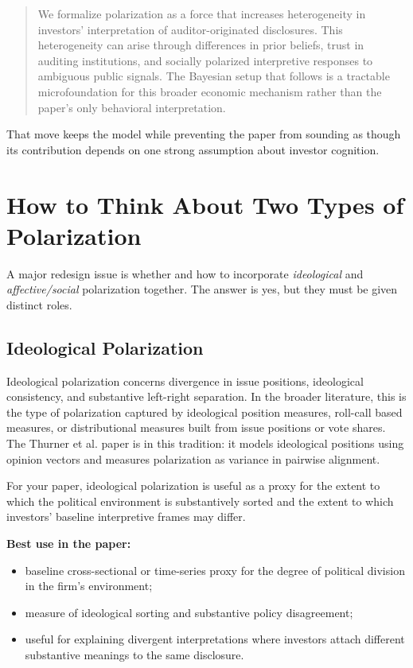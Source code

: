\documentclass[12pt]{article}
\begin{document}
\begin{quote}
We formalize polarization as a force that increases heterogeneity in investors' interpretation of auditor-originated disclosures. This heterogeneity can arise through differences in prior beliefs, trust in auditing institutions, and socially polarized interpretive responses to ambiguous public signals. The Bayesian setup that follows is a tractable microfoundation for this broader economic mechanism rather than the paper's only behavioral interpretation.
\end{quote}

That move keeps the model while preventing the paper from sounding as though its contribution depends on one strong assumption about investor cognition.

\section{How to Think About Two Types of Polarization}

A major redesign issue is whether and how to incorporate \emph{ideological} and \emph{affective/social} polarization together. The answer is yes, but they must be given distinct roles.

\subsection{Ideological Polarization}

Ideological polarization concerns divergence in issue positions, ideological consistency, and substantive left-right separation. In the broader literature, this is the type of polarization captured by ideological position measures, roll-call based measures, or distributional measures built from issue positions or vote shares. The Thurner et al. paper is in this tradition: it models ideological positions using opinion vectors and measures polarization as variance in pairwise alignment. \cite{thurner2025}

For your paper, ideological polarization is useful as a proxy for the extent to which the political environment is substantively sorted and the extent to which investors' baseline interpretive frames may differ.

\textbf{Best use in the paper:}
\begin{itemize}
    \item baseline cross-sectional or time-series proxy for the degree of political division in the firm's environment;
    \item measure of ideological sorting and substantive policy disagreement;
    \item useful for explaining divergent interpretations where investors attach different substantive meanings to the same disclosure.
\end{itemize}
\end{document}
